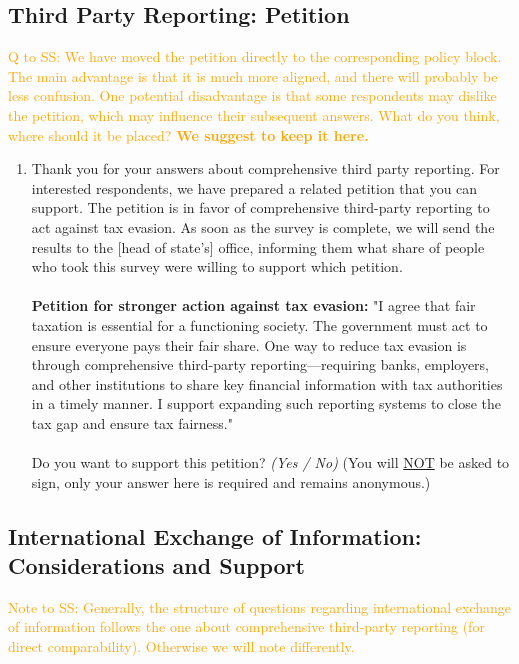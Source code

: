 \documentclass[11pt]{article}
\newcommand{\tk}[1]{\textcolor{orange}{#1}}
\begin{document}
\subsection*{Third Party Reporting: Petition}
\tk{Q to SS: We have moved the petition directly to the corresponding policy block. The main advantage is that it is much more aligned, and there will probably be less confusion. One potential disadvantage is that some respondents may dislike the petition, which may influence their subsequent answers. What do you think, where should it be placed? \textbf{We suggest to keep it here.}} 
\begin{enumerate}[resume]
    \item Thank you for your answers about comprehensive third party reporting. For interested respondents, we have prepared a related petition that you can support. The petition is in favor of comprehensive third-party reporting to act against tax evasion. As soon as the survey is complete, we will send the results to the [head of state’s] office, informing them what share of people who took this survey were willing to support which petition. \\ \\
    \textbf{Petition for stronger action against tax evasion:} "I agree that fair taxation is essential for a functioning society. The government must act to ensure everyone pays their fair share. One way to reduce tax evasion is through comprehensive third-party reporting---requiring banks, employers, and other institutions to share key financial information with tax authorities in a timely manner. I support expanding such reporting systems to close the tax gap and ensure tax fairness." \\ \\
        Do you want to support this petition? \textit{(Yes / No)} (You will \underline{NOT} be asked to sign, only your answer here is required and remains anonymous.)
\end{enumerate}
\subsection*{International Exchange of Information: Considerations and Support}
\tk{Note to SS: Generally, the structure of questions regarding international exchange of information follows the one about comprehensive third-party reporting (for direct comparability). Otherwise we will note differently.} 
\end{document}
